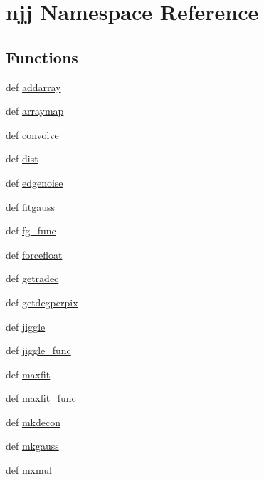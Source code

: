 \hypertarget{namespacenjj}{\section{njj \-Namespace \-Reference}
\label{namespacenjj}
}
\subsection*{\-Functions}
\begin{DoxyCompactItemize}
\item 
def \hyperlink{namespacenjj_abfa84af11c2bc7c4361f3569adc396df}{addarray}
\item 
def \hyperlink{namespacenjj_a8a3e4aa6ebaea61651610ca032c38aa9}{arraymap}
\item 
def \hyperlink{namespacenjj_a8c41629fc84338b43350ce96c7602177}{convolve}
\item 
def \hyperlink{namespacenjj_aafd856c44409b0f95e079c3b066652c9}{dist}
\item 
def \hyperlink{namespacenjj_ab5401bbc10bb9bc098aac9aa6cdf2f86}{edgenoise}
\item 
def \hyperlink{namespacenjj_acc7c03fb548bc2d279694b6cee734a6e}{fitgauss}
\item 
def \hyperlink{namespacenjj_ae50cf701dffecaa6818e160dc5891c3b}{fg\-\_\-func}
\item 
def \hyperlink{namespacenjj_a1e1dffc46466456144b5cfdd5358c565}{forcefloat}
\item 
def \hyperlink{namespacenjj_a63339bfa16b2772d0032f666c33aa35b}{getradec}
\item 
def \hyperlink{namespacenjj_a8c77b2b24eac4442788fd7df3c9a21da}{getdegperpix}
\item 
def \hyperlink{namespacenjj_ac8da89b9c02f65424ca141f8b1596c47}{jiggle}
\item 
def \hyperlink{namespacenjj_a8ad51dc917b000f0423e6aa878565e35}{jiggle\-\_\-func}
\item 
def \hyperlink{namespacenjj_a1874c1850f26661697e7645269aed7e3}{maxfit}
\item 
def \hyperlink{namespacenjj_a9fa58924b945d74e42ead1cfc0d9c189}{maxfit\-\_\-func}
\item 
def \hyperlink{namespacenjj_a6437784cc694df41375900c3dc03e227}{mkdecon}
\item 
def \hyperlink{namespacenjj_a746009c2f8ce49b0e6721bd670b49707}{mkgauss}
\item 
def \hyperlink{namespacenjj_abd150aa97141fb4d02c7480d06fad2a4}{mxmul}
\item 

\end{DoxyCompactItemize}
